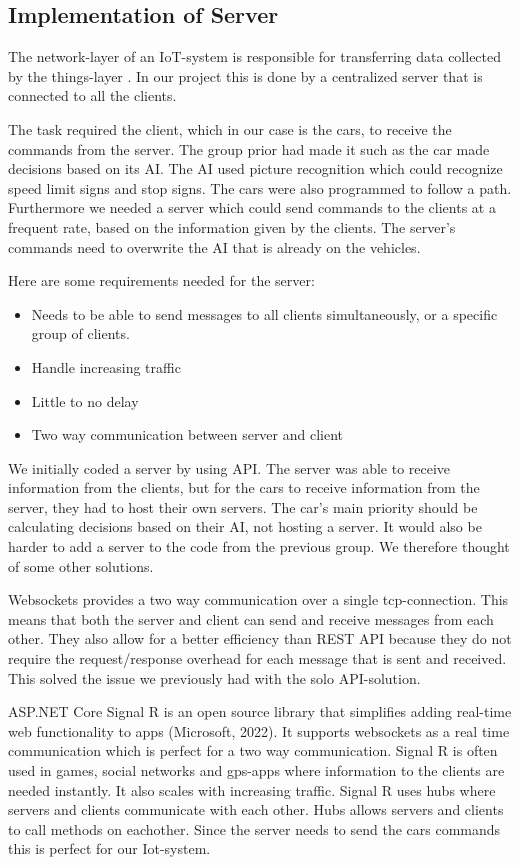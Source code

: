 \subsection{Implementation of Server}
The network-layer of an IoT-system is responsible for transferring data collected by the things-layer \parencite[pp. 8-9]{iot_platforms}. In our project this is done by a centralized server that is connected to all the clients. 

The task required the client, which in our case is the cars, to receive the commands from the server. The group prior had made it such as the car made decisions based on its AI. The AI used picture recognition which could recognize speed limit signs and stop signs. The cars were also programmed to follow a path. Furthermore we needed a server which could send commands to the clients at a frequent rate, based on the information given by the clients. The server’s commands need to overwrite the AI that is already on the vehicles.

Here are some requirements needed for the server:
\begin{itemize}
	\item Needs to be able to send messages to all clients simultaneously, or a specific group of clients.
	\item Handle increasing traffic
	\item Little to no delay
	\item Two way communication between server and client
\end{itemize}

We initially coded a server by using API. The server was able to receive information from the clients, but for the cars to receive information from the server, they had to host their own servers. The car’s main priority should be calculating decisions based on their AI, not hosting a server. It would also be harder to add a server to the code from the previous group. We therefore thought of some other solutions. 

Websockets provides a two way communication over a single tcp-connection. This means that both the server and client can send and receive messages from each other. They also allow for a better efficiency than REST API because they do not require the request/response overhead for each message that is sent and received. This solved the issue we previously had with the solo API-solution.

ASP.NET Core Signal R is an open source library that simplifies adding real-time web functionality to apps (Microsoft, 2022). It supports websockets as a real time communication which is perfect for a two way communication. Signal R is often used in games, social networks and gps-apps where information to the clients are needed instantly. It also scales with increasing traffic. Signal R uses hubs where servers and clients communicate with each other. Hubs allows servers and clients to call methods on eachother. Since the server needs to send the cars commands this is perfect for our Iot-system.

